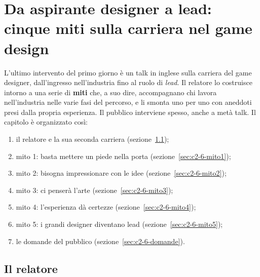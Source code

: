 
\chapter[Cinque miti sulla carriera del designer]{Da aspirante designer a lead:
cinque miti sulla carriera nel game design}
\label{cap:c2-6-miti-carriera}

L'ultimo intervento del primo giorno è un talk in inglese sulla carriera del game
designer, dall'ingresso nell'industria fino al ruolo di \emph{lead}. Il relatore lo
costruisce intorno a una serie di \textbf{miti} che, a suo dire, accompagnano chi
lavora nell'industria nelle varie fasi del percorso, e li smonta uno per uno con
aneddoti presi dalla propria esperienza. Il pubblico interviene spesso, anche a
metà talk. Il capitolo è organizzato così:
\begin{enumerate}
  \item il relatore e la sua seconda carriera (sezione~\ref{sec:c2-6-relatore});
  \item mito 1: basta mettere un piede nella porta
        (sezione~\ref{sec:c2-6-mito1});
  \item mito 2: bisogna impressionare con le idee
        (sezione~\ref{sec:c2-6-mito2});
  \item mito 3: ci penserà l'arte (sezione~\ref{sec:c2-6-mito3});
  \item mito 4: l'esperienza dà certezze (sezione~\ref{sec:c2-6-mito4});
  \item mito 5: i grandi designer diventano lead (sezione~\ref{sec:c2-6-mito5});
  \item le domande del pubblico (sezione~\ref{sec:c2-6-domande}).
\end{enumerate}

\section{Il relatore}
\label{sec:c2-6-relatore}

